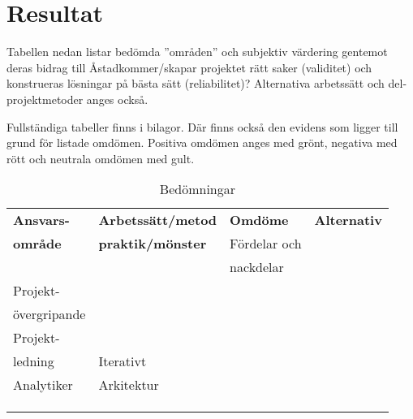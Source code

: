
\section{Resultat}
Tabellen nedan listar bedömda ”områden” och subjektiv värdering gentemot deras bidrag 
till Åstadkommer/skapar projektet rätt saker (validitet) och konstrueras lösningar på 
bästa sätt (reliabilitet)? Alternativa arbetssätt och del-projektmetoder anges också.

Fullständiga tabeller finns i bilagor. Där finns också den evidens som ligger till 
grund för listade omdömen. Positiva omdömen anges med grönt, negativa med rött och 
neutrala omdömen med gult. 

\begin{table}[htbp]
\caption{Bedömningar}
\begin{center}
\begin{tabular}{|l|l|l|l|}
\hline
\textbf{Ansvars-}   & \textbf{Arbetssätt/metod}     & \textbf{Omdöme}       & \textbf{Alternativ} \\
\textbf{område}     & \textbf{praktik/mönster}      & Fördelar och          & \\
                    &                               & nackdelar             &  \\
\hline
Projekt-            &                               &                       & \\
övergripande        &                               &                       & \\
\hline
Projekt-            &                               &                       & \\
ledning             & Iterativt                     & \cellcolor{green}     & \\
\hline
Analytiker          & Arkitektur                    &                       & \\
\hline
                    &                               & \cellcolor{pink}      & \\
\hline
                    &                               & \cellcolor{yellow}    & \\
\hline
                    &                               &                       & \\
\hline
\end{tabular}
\label{tab1}
\end{center}
\end{table}

